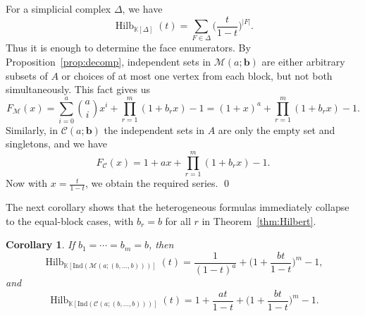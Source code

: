 \documentclass[12pt]{article}
\renewenvironment{proof}{{\bf \noindent Proof.}}{\qed}
\newtheorem{corollary}[theorem]{Corollary}
\theoremstyle{definition}
\theoremstyle{remark}
\DeclareMathOperator{\Hilb}{Hilb}
\newcommand{\kk}{\mathbb{K}}
\newcommand{\MM}{\mathcal{M}}
\newcommand{\CC}{\mathcal{C}}
\newcommand{\ind}{\mathrm{Ind}}
\newcommand{\bk}[1]{\mathbf{#1}}
\begin{document}
	\begin{proof}
		For a simplicial complex $\Delta$, we have
		$$
		\Hilb_{\kk[\Delta]}(t)=\sum_{F\in\Delta}\Big(\frac{t}{1-t}\Big)^{|F|}.
		$$
		Thus it is enough to determine the face enumerators. By Proposition~\ref{prop:decomp}, independent sets in $\MM(a;\bk{b})$ are either arbitrary subsets of $A$ or choices of at most one vertex from each block, but not both simultaneously. This fact gives us
		$$
		F_{\MM}(x)=\sum_{i=0}^a \binom{a}{i}x^i+\prod_{r=1}^m(1+b_r x)-1
		=(1+x)^a+\prod_{r=1}^m(1+b_r x)-1.
		$$
		Similarly, in $\CC(a;\bk{b})$ the independent sets in $A$ are only the empty set and singletons, and we have
		$$
		F_{\CC}(x)=1+ax+\prod_{r=1}^m(1+b_r x)-1.
		$$
		Now with $x=\tfrac{t}{1-t}$, we obtain the required series.
	\end{proof}
	
	 \medskip The next corollary shows that the heterogeneous formulas immediately collapse to the equal-block cases, with $b_r=b$ for all $r$ in Theorem~\ref{thm:Hilbert}.
	
	\begin{corollary}\label{cor:Hilbert-equal}
		If $b_1=\cdots=b_m=b$, then
		$$
		\Hilb_{\kk[\ind(\MM(a;(b,\dots,b)))]}(t)=\frac{1}{(1-t)^a}+\Big(1+\frac{bt}{1-t}\Big)^m-1,
		$$
		and
		$$
		\Hilb_{\kk[\ind(\CC(a;(b,\dots,b)))]}(t)=1+\frac{at}{1-t}+\Big(1+\frac{bt}{1-t}\Big)^m-1.
		$$
	\end{corollary}
	
\end{document}
